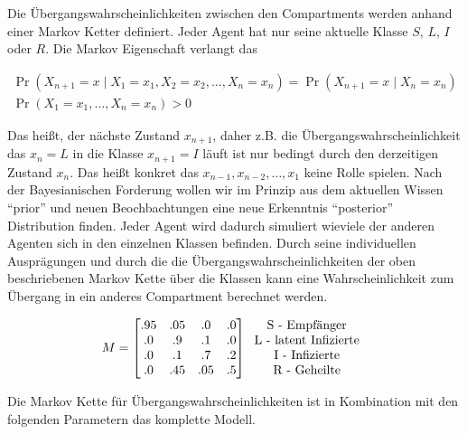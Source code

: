 \documentclass[paper=a4, fontsize=11pt, ngerman, abstract=on]{scrartcl}
\numberwithin{equation}{section} %
\numberwithin{figure}{section} %
\numberwithin{table}{section} %
\begin{document}
Die Übergangswahrscheinlichkeiten zwischen den Compartments werden anhand einer Markov Ketter definiert. Jeder Agent hat nur seine aktuelle Klasse $S$, $L$, $I$ oder $R$. Die Markov Eigenschaft verlangt das

\begin{gather*}
\Pr(X_{n+1}=x\mid X_{1}=x_{1},X_{2}=x_{2},\ldots ,X_{n}=x_{n})=\Pr(X_{n+1}=x\mid X_{n}=x_{n}) \\
\Pr(X_{1}=x_{1},\ldots,X_{n}=x_{n})>0
\end{gather*}

Das heißt, der nächste Zustand $x_{n + 1}$, daher z.B. die Übergangswahrscheinlichkeit das $x_{n} = L$ in die Klasse $x_{n + 1} = I$ läuft ist nur bedingt durch den derzeitigen Zustand $x_{n}$. Das heißt konkret das $x_{n-1}, x_{n-2}, \ldots, x_{1}$ keine Rolle spielen. Nach der Bayesianischen Forderung wollen wir im Prinzip aus dem aktuellen Wissen ``prior'' und neuen Beochbachtungen eine neue Erkenntnis ``posterior'' Distribution finden. Jeder Agent wird dadurch simuliert wieviele der anderen Agenten sich in den einzelnen Klassen befinden. Durch seine individuellen Ausprägungen und durch die die Übergangswahrscheinlichkeiten der oben beschriebenen Markov Kette über die Klassen kann eine Wahrscheinlichkeit zum Übergang in ein anderes Compartment berechnet werden.

\[
M=
  \begin{bmatrix}
    .95 & .05 & .0 & .0 \\
    .0 & .9 & .1 & .0 \\
    .0 & .1 & .7 & .2 \\
    .0 & .45 & .05 & .5 \\
  \end{bmatrix}
  \begin{tabular}{c}
    \text{S - Empfänger} \\
    \text{L - latent Infizierte} \\
    \text{I - Infizierte} \\
    \text{R - Geheilte}
  \end{tabular}
\]

Die Markov Kette für Übergangswahrscheinlichkeiten ist in Kombination mit den folgenden Parametern das komplette Modell.
\end{document}
